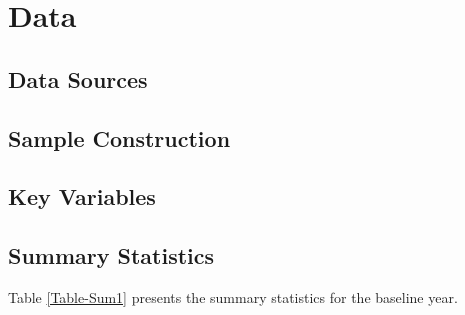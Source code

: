 \section{Data}
\label{sec:data}

\subsection{Data Sources}

\subsection{Sample Construction}

\subsection{Key Variables}

\subsection{Summary Statistics}

Table \ref{Table-Sum1} presents the summary statistics for the baseline year.

